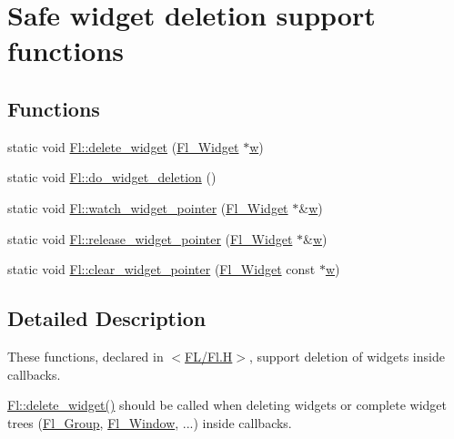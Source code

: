 \hypertarget{group__fl__del__widget}{}\section{Safe widget deletion support functions}
\label{group__fl__del__widget}
\subsection*{Functions}
\begin{DoxyCompactItemize}
\item 
static void \hyperlink{group__fl__del__widget_ga5908e37029f697e8b2f86a2f48d98b18}{Fl\+::delete\+\_\+widget} (\hyperlink{class_fl___widget}{Fl\+\_\+\+Widget} $\ast$\hyperlink{group__fl__screen_ga4fcd39428db4299026322c91715cf379}{w})
\item 
static void \hyperlink{group__fl__del__widget_gab3643acf692210ed29df86032b902869}{Fl\+::do\+\_\+widget\+\_\+deletion} ()
\item 
static void \hyperlink{group__fl__del__widget_gaa6dcacf7538e5424c8366f7a569c0e05}{Fl\+::watch\+\_\+widget\+\_\+pointer} (\hyperlink{class_fl___widget}{Fl\+\_\+\+Widget} $\ast$\&\hyperlink{group__fl__screen_ga4fcd39428db4299026322c91715cf379}{w})
\item 
static void \hyperlink{group__fl__del__widget_gabcf12c2424e03d16611f69cf8cf5a033}{Fl\+::release\+\_\+widget\+\_\+pointer} (\hyperlink{class_fl___widget}{Fl\+\_\+\+Widget} $\ast$\&\hyperlink{group__fl__screen_ga4fcd39428db4299026322c91715cf379}{w})
\item 
static void \hyperlink{group__fl__del__widget_ga23a2b4509c67d3d90029ccc493f2575d}{Fl\+::clear\+\_\+widget\+\_\+pointer} (\hyperlink{class_fl___widget}{Fl\+\_\+\+Widget} const $\ast$\hyperlink{group__fl__screen_ga4fcd39428db4299026322c91715cf379}{w})
\end{DoxyCompactItemize}


\subsection{Detailed Description}
These functions, declared in $<$\hyperlink{_fl_8_h}{F\+L/\+Fl.\+H}$>$, support deletion of widgets inside callbacks.

\hyperlink{group__fl__del__widget_ga5908e37029f697e8b2f86a2f48d98b18}{Fl\+::delete\+\_\+widget()} should be called when deleting widgets or complete widget trees (\hyperlink{class_fl___group}{Fl\+\_\+\+Group}, \hyperlink{class_fl___window}{Fl\+\_\+\+Window}, ...) inside callbacks.

